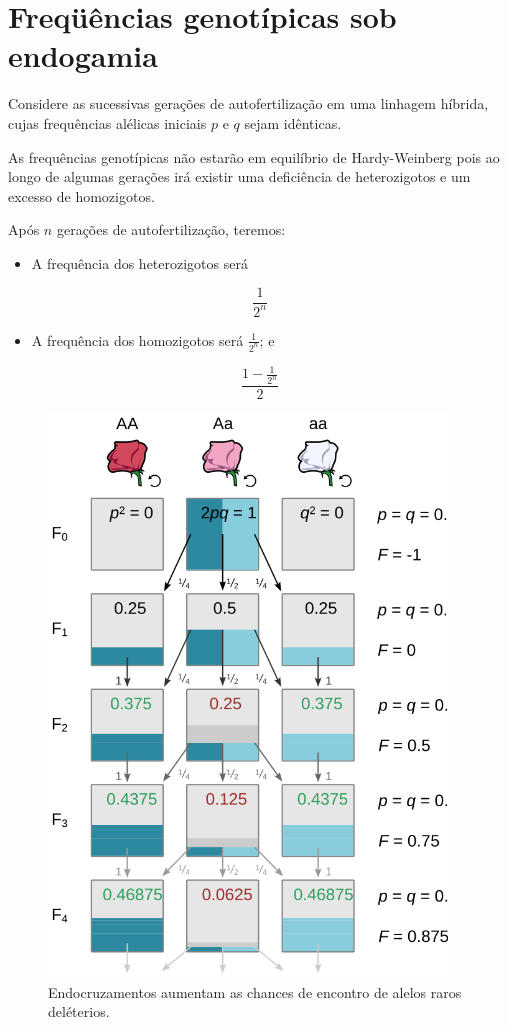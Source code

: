 \documentclass[
]{book}
\providecommand{\tightlist}{%
  \setlength{\itemsep}{0pt}\setlength{\parskip}{0pt}}
\begin{document}
\hypertarget{frequxfcuxeancias-genotuxedpicas-sob-endogamia}{%
\section{Freqüências genotípicas sob endogamia}\label{frequxfcuxeancias-genotuxedpicas-sob-endogamia}}

Considere as sucessivas gerações de autofertilização em uma linhagem híbrida, cujas frequências alélicas iniciais \(p\) e \(q\) sejam idênticas.

As frequências genotípicas não estarão em equilíbrio de Hardy-Weinberg pois ao longo de algumas gerações irá existir uma deficiência de heterozigotos e um excesso de homozigotos.

Após \(n\) gerações de autofertilização, teremos:

\begin{itemize}
\tightlist
\item
  A frequência dos heterozigotos será
\end{itemize}

\[\frac {1}{2^n}\]

\begin{itemize}
\tightlist
\item
  A frequência dos homozigotos será \(\frac {1}{2^n}\); e
\end{itemize}

\[\frac {1- \frac {1}{2^n}}{2}\]

\begin{figure}

{\centering \includegraphics[width=400px]{figs/inbreeding_self_fertilization} 

}

\caption{Endocruzamentos aumentam as chances de encontro de alelos raros deléterios.}\label{fig:inbreedingfertilization}
\end{figure}
\end{document}
